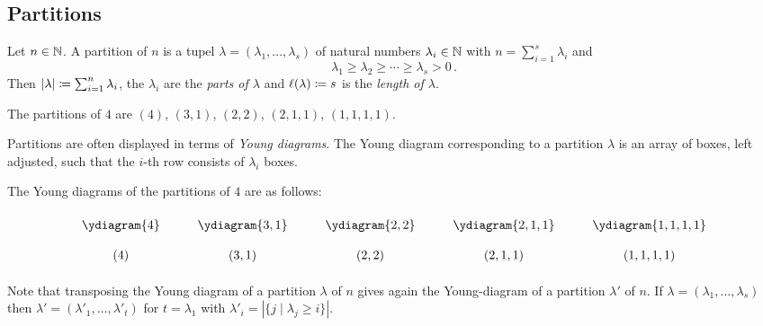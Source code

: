 \subsection{Partitions}

\begin{definition}
  Let $n \in \mathbb{N}$.
  A partition of $n$ is a tupel $\lambda = (\lambda_1, \dotsc, \lambda_s)$ of natural numbers $\lambda_i \in \mathbb{N}$ with $n = \sum_{i=1}^s \lambda_i$ and
  \[
          \lambda_1
    \geq  \lambda_2
    \geq  \dotsb
    \geq  \lambda_s
    >  0 \,.
  \]
  Then $|\lambda| \coloneqq \sum_{i=1}^n \lambda_i$, the $\lambda_i$ are the \emph{parts of $\lambda$} and $\ell(\lambda) \coloneqq s$ is the \emph{length of $\lambda$}.
\end{definition}


\begin{example}
  The partitions of $4$ are $(4)$, $(3,1)$, $(2,2)$, $(2,1,1)$, $(1,1,1,1)$.
\end{example}


\begin{fluff}
  Partitions are often displayed in terms of \emph{Young diagrams}.
  The Young diagram corresponding to a partition $\lambda$ is an array of boxes, left adjusted, such that the $i$-th row consists of $\lambda_i$ boxes.
\end{fluff}


\begin{example}
  The Young diagrams of the partitions of $4$ are as follows:
  \[
    \renewcommand{\arraystretch}{2}
    \begin{matrix}
        \ydiagram{4}
      & \quad
      & \ydiagram{3,1}
      & \quad
      & \ydiagram{2,2}
      & \quad
      & \ydiagram{2,1,1}
      & \quad
      & \ydiagram{1,1,1,1}
      \\
        (4)
      & {}
      & (3,1)
      & {}
      & (2,2)
      & {}
      & (2,1,1)
      & {}
      & (1,1,1,1)
    \end{matrix}
  \]
\end{example}


\begin{fluff}
  Note that transposing the Young diagram of a partition $\lambda$ of $n$ gives again the Young-diagram of a partition $\lambda'$ of $n$.
  If $\lambda = (\lambda_1, \dotsc, \lambda_s)$ then $\lambda' = (\lambda'_1, \dotsc, \lambda'_t)$ for $t = \lambda_1$ with $\lambda'_i = |\{j \mid \lambda_j \geq i\}|$.
\end{fluff}

